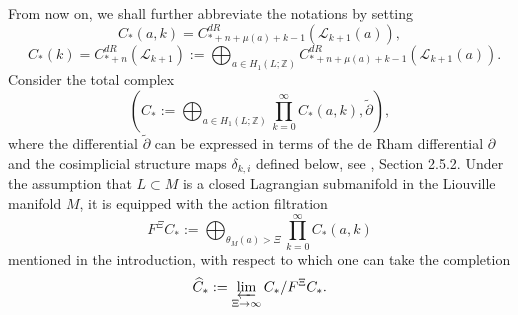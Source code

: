 \documentclass[a4paper]{article}
\numberwithin{equation}{section}
\begin{document}
From now on, we shall further abbreviate the notations by setting
\begin{equation}
C_\ast(a,k)=C^\mathit{dR}_{\ast+n+\mu(a)+k-1}(\mathcal{L}_{k+1}(a)),
\end{equation}
\begin{equation}
\textrm{ }C_\ast(k)=C_{\ast+n}^\mathit{dR}(\mathcal{L}_{k+1}):=\bigoplus_{a\in H_1(L;\mathbb{Z})}C_{\ast+n+\mu(a)+k-1}^\mathit{dR}(\mathcal{L}_{k+1}(a)).
\end{equation}
Consider the total complex
\begin{equation}\label{eq:tot}
\left(C_\ast:=\bigoplus_{a\in H_1(L;\mathbb{Z})}\prod_{k=0}^\infty C_\ast(a,k),\tilde{\partial}\right),
\end{equation}
where the differential $\tilde{\partial}$ can be expressed in terms of the de Rham differential $\partial$ and the cosimplicial structure maps $\delta_{k,i}$ defined below, see \cite{ki1}, Section 2.5.2. Under the assumption that $L\subset M$ is a closed Lagrangian submanifold in the Liouville manifold $M$, it is equipped with the action filtration
\begin{equation}\label{eq:Xi}
F^\Xi C_\ast:=\bigoplus_{\theta_M(a)>\Xi}\prod_{k=0}^\infty C_\ast(a,k)
\end{equation}
mentioned in the introduction, with respect to which one can take the completion
\begin{equation}\label{eq:completion}
\widehat{C}_\ast:=\varprojlim_{\Xi\rightarrow\infty}C_\ast/F^\Xi C_\ast.
\end{equation}
\end{document}

